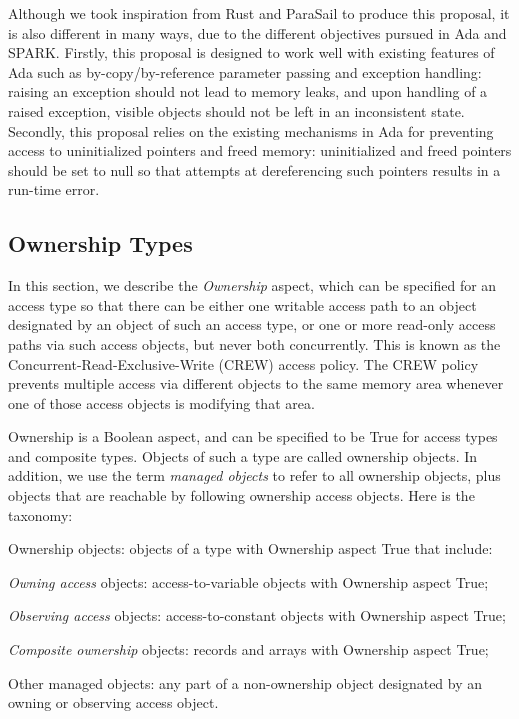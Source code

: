\documentclass{llncs}
\begin{document}
Although we took inspiration from Rust and ParaSail to produce this proposal, it is also different in many ways, due to the different objectives pursued in Ada and SPARK. Firstly,
this proposal is designed to work well with existing features of Ada such as by-copy/by-reference parameter passing and exception handling: raising an exception should not lead to
memory leaks, and upon handling of a raised exception, visible objects should not be left in an inconsistent state. Secondly, this proposal relies on the existing mechanisms in Ada
for preventing access to uninitialized pointers and freed memory: uninitialized and freed pointers should be set to null so that attempts at dereferencing such pointers results in a run-time error.


\subsection{Ownership Types}
\label{sec:ownership}

In this section, we describe the \textit{Ownership} aspect, which can be specified for an access type so that there can be either one writable access path to an object
designated by an object of such an access type, or one or more read-only access paths via such access objects, but never both concurrently. This is known as
the Concurrent-Read-Exclusive-Write (CREW) access policy. The CREW policy prevents multiple access via different objects to the same memory area whenever one
of those access objects is modifying that area.

Ownership is a Boolean aspect, and can be specified to be True for access types and composite types.  Objects of such a type are called ownership objects.
In addition, we use the term \textit{managed objects} to refer to all ownership objects, plus objects that are reachable by following ownership access objects.
Here is the taxonomy:

\begin{compactitem}
\item Ownership objects: objects of a type with Ownership aspect True that include:
    \begin{compactitem}
\item \textit{Owning access} objects: access-to-variable objects with Ownership aspect True;
\item \textit{Observing access} objects: access-to-constant objects with Ownership aspect True;
\item \textit{Composite ownership} objects: records and arrays with Ownership aspect True;
    \end{compactitem}
\item Other managed objects: any part of a non-ownership object designated by an owning or observing access object.
\end{compactitem}
\end{document}
